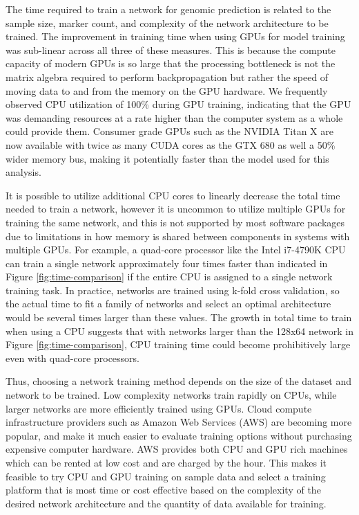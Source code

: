 The time required to train a network for genomic prediction is related to
the sample size, marker count, and complexity of the network architecture to be trained.
The improvement in training time when using GPUs for model training was sub-linear across 
all three of these measures. This is because the compute capacity of modern GPUs is 
so large that the processing bottleneck is not the matrix algebra required 
to perform backpropagation but rather the speed of moving data to and from 
the memory on the GPU hardware. We frequently observed CPU utilization of 
100\% during GPU training, indicating that the GPU was demanding resources
at a rate higher than the computer system as a whole could provide them.
Consumer grade GPUs such as the NVIDIA Titan X are now available with twice 
as many CUDA cores as the GTX 680 as well a 50\% wider memory bus, making it potentially
faster than the model used for this analysis. 

It is possible to utilize additional CPU cores to linearly decrease the total time 
needed to train a network, however it is uncommon to utilize multiple GPUs for 
training the same network, and this is not supported by most software packages 
due to limitations in how memory is shared between components in systems with 
multiple GPUs. For example, a quad-core processor like the Intel i7-4790K CPU 
can train a single network approximately four times faster than indicated in 
Figure \ref{fig:time-comparison} if the entire CPU is assigned to a single
network training task. In practice, networks are trained using k-fold
cross validation, so the actual time to fit a family of networks and select
an optimal architecture would be several times larger than these values.
The growth in total time to train when using a CPU suggests that with 
networks larger than the 128x64 network in Figure \ref{fig:time-comparison}, 
CPU training time could become prohibitively large even with quad-core processors. 

Thus, choosing a network training method depends on the size of the dataset and network
to be trained. Low complexity networks train rapidly on CPUs, while larger networks
are more efficiently trained using GPUs. Cloud compute infrastructure providers such 
as Amazon Web Services (AWS) are becoming more popular, and make it much easier
to evaluate training options without purchasing expensive computer hardware.
AWS provides both CPU and GPU rich machines which can be rented at low cost 
and are charged by the hour. This makes it feasible to try CPU and GPU training
on sample data and select a training platform that is most time or cost effective based on the 
complexity of the desired network architecture and the quantity of data available
for training. 

